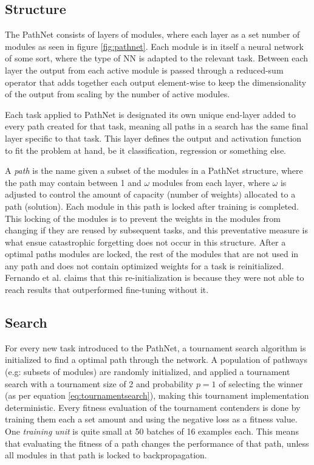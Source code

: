 \subsection{Structure}
The PathNet consists of layers of modules, where each layer as a set number of modules as seen in figure \ref{fig:pathnet}. Each module is in itself a neural network of some sort, where the type of NN is adapted to the relevant task. Between each layer the output from each active module is passed through a reduced-sum operator that adds together each output element-wise to keep the dimensionality of the output from scaling by the number of active modules. 

Each task applied to PathNet is designated its own unique end-layer added to every path created for that task, meaning all paths in a search has the same final layer specific to that task. This layer defines the output and activation function to fit the problem at hand, be it classification, regression or something else.  

A \textit{path} is the name given a subset of the modules in a PathNet structure, where the path may contain between 1 and \(\omega\) modules from each layer, where \(\omega\) is adjusted to control the amount of capacity (number of weights) allocated to a path (solution). Each module in this path is locked after training is completed. This locking of the modules is to prevent the weights in the modules from changing if they are reused by subsequent tasks, and this preventative measure is what ensue catastrophic forgetting does not occur in this structure. After a optimal paths modules are locked, the rest of the modules that are not used in any path and does not contain optimized weights for a task is reinitialized. Fernando et al. claims\cite{pathnet} that this re-initialization is because they were not able to reach results that outperformed fine-tuning without it.

\subsection{Search}\label{background:pathnet.search}
For every new task introduced to the PathNet, a tournament search algorithm is initialized to find a optimal path through the network. A population of pathways (e.g: subsets of modules) are randomly initialized, and applied a tournament search with a tournament size of 2 and probability \(p=1\) of selecting the winner (as per equation \ref{eq:tournamentsearch}), making this tournament implementation deterministic. Every fitness evaluation of the tournament contenders is done by training them each a set amount and using the negative loss as a fitness value. One \textit{training unit} is quite small at 50 batches of 16 examples each. This means that evaluating the fitness of a path changes the performance of that path, unless all modules in that path is locked to backpropagation.

